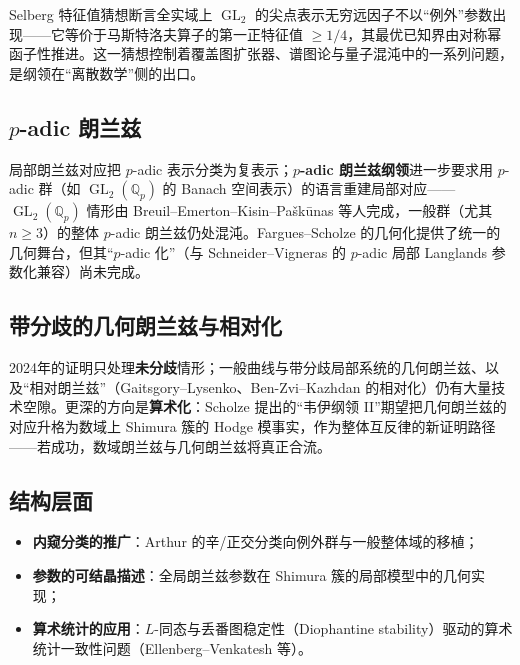 Selberg 特征值猜想断言全实域上 $\operatorname{GL}_2$ 的尖点表示无穷远因子不以“例外”参数出现——它等价于马斯特洛夫算子的第一正特征值 $\ge 1/4$，其最优已知界由对称幂函子性推进。这一猜想控制着覆盖图扩张器、谱图论与量子混沌中的一系列问题，是纲领在“离散数学”侧的出口。

\subsection{$p$-adic 朗兰兹}

局部朗兰兹对应把 $p$-adic 表示分类为复表示；\textbf{$p$-adic 朗兰兹纲领}进一步要求用 $p$-adic 群（如 $\operatorname{GL}_2(\mathbb{Q}_p)$ 的 Banach 空间表示）的语言重建局部对应——$\operatorname{GL}_2(\mathbb{Q}_p)$ 情形由 Breuil--Emerton--Kisin--Pa\v{s}k\=unas 等人完成，一般群（尤其 $n \ge 3$）的整体 $p$-adic 朗兰兹仍处混沌。Fargues--Scholze 的几何化\cite{fargues2021}提供了统一的几何舞台，但其“$p$-adic 化”（与 Schneider--Vigneras 的 $p$-adic 局部 Langlands 参数化兼容）尚未完成。

\subsection{带分歧的几何朗兰兹与相对化}

2024年的证明只处理\textbf{未分歧}情形；一般曲线与带分歧局部系统的几何朗兰兹、以及“相对朗兰兹”（Gaitsgory--Lysenko、Ben-Zvi--Kazhdan 的相对化）仍有大量技术空隙。更深的方向是\textbf{算术化}：Scholze 提出的“韦伊纲领 II”期望把几何朗兰兹的对应升格为数域上 Shimura 簇的 Hodge 模事实，作为整体互反律的新证明路径——若成功，数域朗兰兹与几何朗兰兹将真正合流。

\subsection{结构层面}

\begin{itemize}
    \item \textbf{内窥分类的推广}：Arthur 的辛/正交分类\cite{arthur2013}向例外群与一般整体域的移植；
    \item \textbf{参数的可结晶描述}：全局朗兰兹参数在 Shimura 簇的局部模型中的几何实现；
    \item \textbf{算术统计的应用}：$L$-同态与丢番图稳定性（Diophantine stability）驱动的算术统计一致性问题（Ellenberg--Venkatesh 等）。
\end{itemize}
